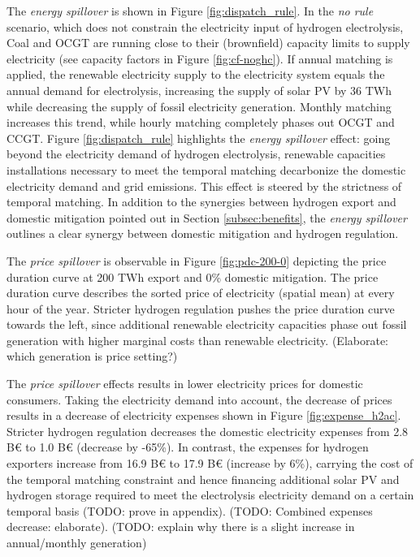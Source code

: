 The \textit{energy spillover} is shown in Figure \ref{fig:dispatch_rule}. In the \textit{no rule} scenario, which does not constrain the electricity input of hydrogen electrolysis, Coal and OCGT are running close to their (brownfield) capacity limits to supply electricity (see capacity factors in Figure \ref{fig:cf-noghc}). If annual matching is applied, the renewable electricity supply to the electricity system equals the annual demand for electrolysis, increasing the supply of solar PV by 36 TWh while decreasing the supply of fossil electricity generation. 
Monthly matching increases this trend, while hourly matching completely phases out OCGT and CCGT. Figure \ref{fig:dispatch_rule} highlights the \textit{energy spillover} effect: going beyond the electricity demand of hydrogen electrolysis, renewable capacities installations necessary to meet the temporal matching decarbonize the domestic electricity demand and grid emissions. This effect is steered by the strictness of temporal matching.
In addition to the synergies between hydrogen export and domestic mitigation pointed out in Section \ref{subsec:benefits}, the \textit{energy spillover} outlines a clear synergy between domestic mitigation and hydrogen regulation.


The \textit{price spillover} is observable in Figure \ref{fig:pdc-200-0} depicting the price duration curve at 200 TWh export and 0\% domestic mitigation. The price duration curve describes the sorted price of electricity (spatial mean) at every hour of the year.
Stricter hydrogen regulation pushes the price duration curve towards the left, since additional renewable electricity capacities phase out fossil generation with higher marginal costs than renewable electricity. (Elaborate: which generation is price setting?)


The \textit{price spillover} effects results in lower electricity prices for domestic consumers. Taking the electricity demand into account, the decrease of prices results in a decrease of electricity expenses shown in 
Figure \ref{fig:expense_h2ac}. Stricter hydrogen regulation decreases the domestic electricity expenses from 2.8 B€ to 1.0 B€ (decrease by -65\%). In contrast, the expenses for hydrogen exporters increase from 16.9 B€ to 17.9 B€ (increase by 6\%), carrying the cost of the temporal matching constraint and hence financing additional solar PV and hydrogen storage required to meet the electrolysis electricity demand on a certain temporal basis (TODO: prove in appendix). (TODO: Combined expenses decrease: elaborate). (TODO: explain why there is a slight increase in annual/monthly generation)


